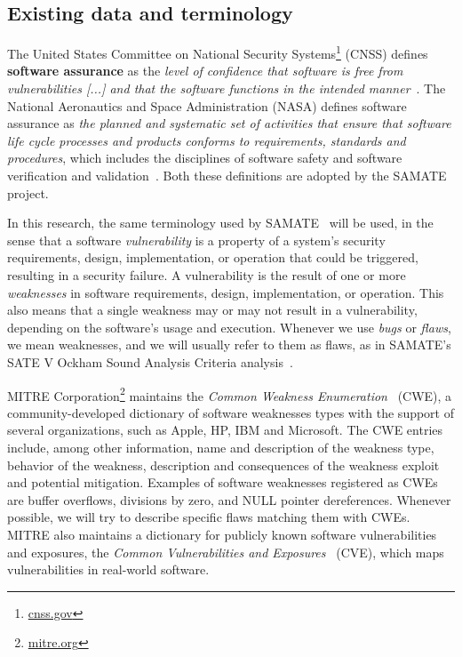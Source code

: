 \subsection{Existing data and terminology}
\label{sub:terminology}

The United States Committee on National Security
Systems\footnote{\url{cnss.gov}} (CNSS) defines \textbf{software assurance} as
the \textit{level of confidence that software is free from vulnerabilities [...]
and that the software functions in the intended
manner}~\cite{instruction20034009}. The National Aeronautics and Space
Administration (NASA) defines software assurance as \textit{the planned and
systematic set of activities that ensure that software life cycle processes and
products conforms to requirements, standards and procedures}, which includes
the disciplines of software safety and software verification and
validation~\cite{nasastd8739}. Both these definitions are adopted by the SAMATE
project.

In this research, the same terminology used by
SAMATE~\cite{black_counting_2011} will be used, in the sense that a software
\textit{vulnerability} is a property of a system's security requirements,
design, implementation, or operation that could be triggered, resulting in a
security failure. A vulnerability is the result of one or more
\textit{weaknesses} in software requirements, design, implementation, or
operation. This also means that a single weakness may or may not result in a
vulnerability, depending on the software's usage and execution. Whenever we use
\textit{bugs} or \textit{flaws}, we mean weaknesses, and we will usually refer
to them as flaws, as in SAMATE's SATE V Ockham Sound Analysis Criteria
analysis~\cite{black_sate_2016}.

MITRE Corporation\footnote{\url{mitre.org}} maintains the \textit{Common Weakness
Enumeration}~\cite{cwe_page} (CWE), a community-developed dictionary of
software weaknesses types with the support of several organizations, such as Apple,
HP, IBM and Microsoft. The CWE entries include, among other information, name
and description of the weakness type, behavior of the weakness, description and
consequences of the weakness exploit and potential mitigation. Examples of
software weaknesses registered as CWEs are buffer overflows, divisions by zero,
and NULL pointer dereferences. Whenever possible, we will try to describe
specific flaws matching them with CWEs. MITRE also maintains a dictionary for
publicly known software vulnerabilities and exposures, the \textit{Common
Vulnerabilities and Exposures}~\cite{cve_page} (CVE), which maps vulnerabilities
in real-world software.

